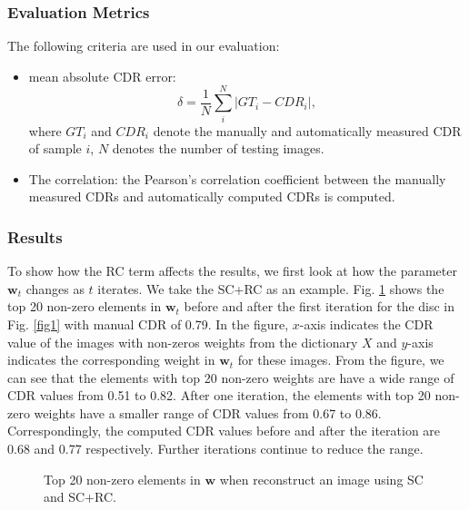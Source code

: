 \documentclass[journal]{IEEEtran}
\begin{document}
 \subsubsection{Evaluation Metrics}
The following criteria are used in our evaluation:
 \begin{itemize}
 	 \item mean absolute CDR error: \begin{equation} \delta=\frac{1}{N}\sum_i^N |GT_{i}-CDR_i|,
 \end{equation} where
$GT_{i}$ and $CDR_i$ denote the manually and automatically measured CDR of sample
$i$, $N$ denotes the number of testing images.
 \item The correlation:  the Pearson's correlation
coefficient between the manually measured CDRs and automatically computed CDRs is computed.
  \end{itemize}
 \subsubsection{Results}
 To show how the RC term affects the results, we first look at how the parameter $\textbf{w}_t$ changes as $t$ iterates. We take the SC+RC as an example. %
 Fig. \ref{figlambda1} shows the top 20 non-zero elements in $\textbf{w}_t$ before and after the first iteration   for the disc in Fig. \ref{fig1} with manual CDR of 0.79. In the figure,   $x$-axis indicates the CDR value of the images with non-zeros weights from the dictionary $X$ and $y$-axis indicates the corresponding weight in $\textbf{w}_t$ for these images. From the figure, we can see that the elements with top 20 non-zero weights are have a wide range of CDR values from 0.51 to 0.82. After one iteration, the elements with top 20 non-zero weights have a smaller range of CDR values from  0.67 to 0.86.
  Correspondingly, the computed CDR values before and after the iteration are 0.68 and 0.77  respectively. Further iterations  continue  to reduce the range.


 \begin{figure}

 	\caption{Top 20 non-zero elements in $\textbf{w}$ when reconstruct an image using SC and SC+RC.  } \label{figlambda1}
 \end{figure}
\end{document}
